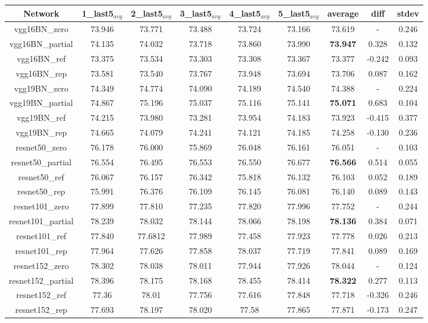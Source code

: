 \documentclass[10pt,twocolumn,letterpaper]{article}
\begin{document}
\begin{table*}
    \centering
    \begin{tabular}{c|ccccc|ccc}
Network&1\_last5$_{avg}$&2\_last5$_{avg}$&3\_last5$_{avg}$&4\_last5$_{avg}$&5\_last5$_{avg}$&average&diff&stdev \\
\hline
vgg16BN\_zero&73.946&73.771&73.488&73.724&73.166&73.619& - &0.246 \\
vgg16BN\_partial&74.135&74.032&73.718&73.860&73.990&\textbf{73.947}&0.328&0.132 \\
vgg16BN\_ref&73.375&73.534 & 73.303 & 73.308 & 73.367 & 73.377 & -0.242 & 0.093 \\
vgg16BN\_rep&73.581 & 73.540 & 73.767 & 73.948 & 73.694 & 73.706 & 0.087 & 0.162 \\
\hline
vgg19BN\_zero&74.349&74.774&74.090&74.189&74.540&74.388& - &0.224 \\
vgg19BN\_partial&74.867&75.196&75.037&75.116&75.141&\textbf{75.071}&0.683&0.104 \\
vgg19BN\_ref& 74.215 & 73.980 & 73.281 & 73.954 & 74.183 & 73.923 & -0.415 & 0.377 \\
vgg19BN\_rep& 74.665 & 74.079 & 74.241 & 74.121 & 74.185 & 74.258 & -0.130 & 0.236 \\
\hline
resnet50\_zero&76.178&76.000&75.869&76.048&76.161&76.051& - &0.103 \\
resnet50\_partial&76.554&76.495&76.553&76.550&76.677&\textbf{76.566}&0.514&0.055 \\
resnet50\_ref&76.067 & 76.157 & 76.342 & 75.818 & 76.132 & 76.103 & 0.052 & 0.189 \\
resnet50\_rep&75.991 & 76.376 & 76.109 & 76.145 & 76.081 & 76.140 & 0.089 & 0.143 \\
\hline
resnet101\_zero&77.899&77.810&77.235&77.820&77.996&77.752& - &0.244 \\
resnet101\_partial&78.239&78.032&78.144&78.066&78.198&\textbf{78.136}&0.384&0.071 \\
resnet101\_ref&77.840 & 77.6812 & 77.989 & 77.458 & 77.923 & 77.778 & 0.026 & 0.213\\
resnet101\_rep&77.964 & 77.626 & 77.858 & 78.037 & 77.719 & 77.841 & 0.089 & 0.169 \\
\hline
resnet152\_zero&78.302&78.038&78.011&77.944&77.926&78.044& - &0.124 \\
resnet152\_partial&78.396&78.175&78.168&78.455&78.414&\textbf{78.322}&0.277&0.113 \\
resnet152\_ref & 77.36 & 78.01 & 77.756 & 77.616 & 77.848 & 77.718 & -0.326 & 0.246 \\
resnet152\_rep & 77.693 & 78.197 & 78.020 & 77.58 & 77.865 & 77.871 & -0.173 & 0.247 \\

\end{tabular}
\end{table*}
\end{document}
